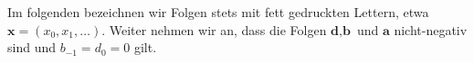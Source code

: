 





\begin{bem}
Im folgenden bezeichnen wir Folgen stets mit fett gedruckten Lettern, etwa $\textbf{x}=(x_0,x_1,\dots)$. Weiter nehmen wir an, dass die Folgen $\textbf{d},\textbf{b}$ und $\textbf{a}$ nicht-negativ sind und $b_{-1}=d_0=0$ gilt.
\end{bem}

